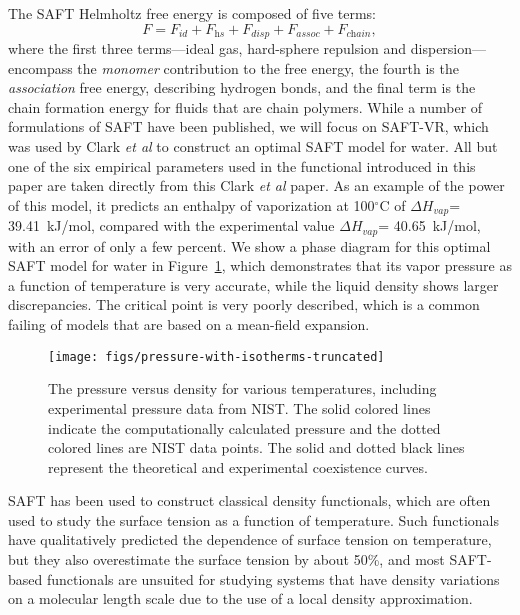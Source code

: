 \documentclass[twocolumn,amsmath,amssymb,prl]{revtex4-1}
\begin{document}
The SAFT Helmholtz free energy is composed of five terms:
\begin{equation} \label{eq:SAFT-free-energy}
  F = F_\textit{id} + F_\textit{hs} + F_\textit{disp} +
  F_\textit{assoc} + F_\textit{chain},
\end{equation}
where the first three terms---ideal gas, hard-sphere repulsion and
dispersion---encompass the \emph{monomer} contribution
to the free energy, the fourth is the \emph{association} free energy,
describing hydrogen bonds, and the final term is the chain formation
energy for fluids that are chain polymers.  While a
number of formulations of SAFT have been published, we will focus on
SAFT-VR\cite{gil-villegas-1997-SAFT-VR}, which was used by Clark
\emph{et al} to construct an optimal SAFT model for
water\cite{clark2006developing}. All but one of the six empirical
parameters used in the functional introduced in this paper are taken
directly from this Clark \emph{et al} paper.  As an example of the
power of this model, it predicts an enthalpy of vaporization at
100$^\circ$C of $\Delta H_{vap}$= 39.41~kJ/mol, compared with the
experimental value $\Delta H_{vap}$= 40.65~kJ/mol\cite{nistwater},
with an error of only a few percent.  We show a phase diagram for
this optimal SAFT model for water in
Figure~\ref{fig:pressure-with-isotherms}, which demonstrates that its
vapor pressure as a function of temperature is very accurate, while
the liquid density shows larger discrepancies.  The critical point is
very poorly described, which is a common failing of models that are
based on a mean-field expansion.

\begin{figure}
\begin{center}
\texttt{[image: figs/pressure-with-isotherms-truncated]}
\end{center}
\caption{The pressure versus density for various temperatures, including
experimental pressure data from NIST\cite{nistwater}. The solid colored lines
indicate the computationally calculated pressure and the dotted
colored lines are NIST data points. The solid and dotted black lines
represent the theoretical and experimental coexistence curves.}
\label{fig:pressure-with-isotherms}
\end{figure}

SAFT has been used to construct classical density functionals,
which are often used to study the surface tension as a function of
temperature\cite{clark2006developing, gloor2004accurate, kahl2008modified,
  gloor2007prediction, blas2001examination, kiselev2006new,
  gloor2002saft,fu2005vapor-liquid-dft, gross2009density,
  yang1994density, Jaqaman2004}.  Such
functionals have qualitatively predicted the dependence of surface
tension on temperature, but they also overestimate
the surface tension by about 50\%, and most SAFT-based functionals are
unsuited for studying systems that have density variations on a
molecular length scale due to the use of a local density
approximation\cite{gloor2002saft,clark2006developing, gloor2007prediction,
gloor2004accurate, kahl2008modified,
blas2001examination, kiselev2006new}.
\end{document}
